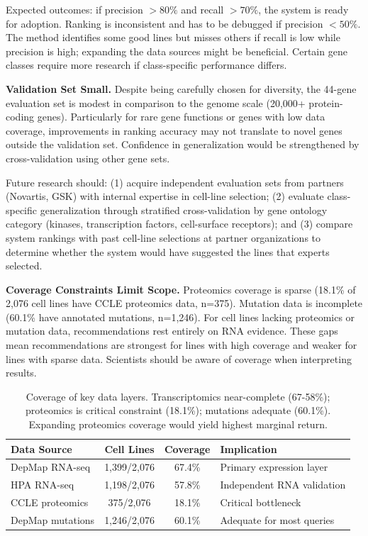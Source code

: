\documentclass[author={Karen Coutinho, Ishaan Bhalla, Aman Raj, Dixit Kaloorani Malarmannan},
                supervisor={Dr. Daniel D'Andrea},
                degree={MSc},
                title={CellSelector Omics: A Multi-Omics Recommendation System for Cell Line Selection},
                subtitle={},
                type={},
                year={2026}]{dissertation}
\begin{document}
Expected outcomes: if precision $>80\%$ and recall $>70\%$, the system is ready for adoption. Ranking is inconsistent and has to be debugged if precision $<50\%$. The method identifies some good lines but misses others if recall is low while precision is high; expanding the data sources might be beneficial. Certain gene classes require more research if class-specific performance differs.

{\bf Validation Set Small.} Despite being carefully chosen for diversity, the 44-gene evaluation set is modest in comparison to the genome scale (20,000+ protein-coding genes). Particularly for rare gene functions or genes with low data coverage, improvements in ranking accuracy may not translate to novel genes outside the validation set. Confidence in generalization would be strengthened by cross-validation using other gene sets.

Future research should: (1) acquire independent evaluation sets from partners (Novartis, GSK) with internal expertise in cell-line selection; (2) evaluate class-specific generalization through stratified cross-validation by gene ontology category (kinases, transcription factors, cell-surface receptors); and (3) compare system rankings with past cell-line selections at partner organizations to determine whether the system would have suggested the lines that experts selected.

{\bf Coverage Constraints Limit Scope.} Proteomics coverage is sparse (18.1\% of 2,076 cell lines have CCLE proteomics data, n=375). Mutation data is incomplete (60.1\% have annotated mutations, n=1,246). For cell lines lacking proteomics or mutation data, recommendations rest entirely on RNA evidence. These gaps mean recommendations are strongest for lines with high coverage and weaker for lines with sparse data. Scientists should be aware of coverage when interpreting results.

\begin{table}[h]
\centering
\begin{tabular}{|l|c|c|l|}
\hline
{\bf Data Source} & {\bf Cell Lines} & {\bf Coverage} & {\bf Implication} \\
\hline
DepMap RNA-seq & 1,399/2,076 & 67.4\% & Primary expression layer \\
HPA RNA-seq & 1,198/2,076 & 57.8\% & Independent RNA validation \\
CCLE proteomics & 375/2,076 & 18.1\% & Critical bottleneck \\
DepMap mutations & 1,246/2,076 & 60.1\% & Adequate for most queries \\
\hline
\end{tabular}
\caption{Coverage of key data layers. Transcriptomics near-complete (67-58\%); 
proteomics is critical constraint (18.1\%); mutations adequate (60.1\%). Expanding 
proteomics coverage would yield highest marginal return.}
\label{tab:coverage}
\end{table}
\end{document}
